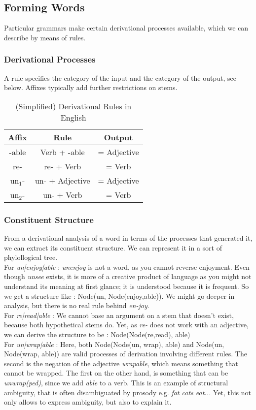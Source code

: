 \documentclass{cours}
\begin{document}
\subsection{Forming Words}
Particular grammars make certain derivational processes available, which we can describe by means of rules.

\subsubsection{Derivational Processes}
A rule specifies the category of the input and the category of the output, see below. Affixes typically add further restrictions on stems.

\begin{table}
    \centering
    \caption{(Simplified) Derivational Rules in English}
    \begin{tabular}{ccc}
        \toprule
        Affix     & Rule            & Output      \\
        \midrule
        -able     & Verb + -able    & = Adjective \\
        re-       & re- + Verb      & = Verb      \\
        un$_{1}$- & un- + Adjective & = Adjective \\
        un$_{2}$- & un- + Verb      & = Verb      \\
    \end{tabular}
\end{table}

\subsubsection{Constituent Structure}
From a derivational analysis of a word in terms of the processes that generated it, we can extract its constituent structure. We can represent it in a sort of phylollogical tree. \\
For \textsl{un|enjoy|able}\! : \textsl{unenjoy} is not a word, as you cannot reverse enjoyment. Even though \textsl{unsee} exists, it is more of a creative product of language as you might not understand its meaning at first glance; it is understood because it is frequent. So we get a structure like\! : Node(un, Node(enjoy,able)). We might go deeper in analysis, but there is no real rule behind \textsl{en-joy}.\\
For \textsl{re|read|able}\! : We cannot base an argument on a stem that doesn't exist, because both hypothetical stems do. Yet, as \textsl{re-} does not work with an adjective, we can derive the structure to be\! : Node(Node(re,read), able)\\
For \textsl{un|wrap|able}\! : Here, both Node(Node(un, wrap), able) and Node(un, Node(wrap, able)) are valid processes of derivation involving different rules. The second is the negation of the adjective \textsl{wrapable}, which means something that cannot be wrapped. The first on the other hand, is something that can be \textsl{unwrap(ped)}, since we add \textsl{able} to a verb. This is an example of structural ambiguity, that is often disambiguated by prosody e.g. \textsl{fat cats eat...} Yet, this not only allows to express ambiguity, but also to explain it.
\end{document}
